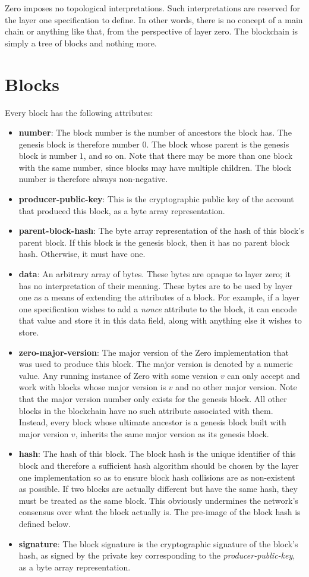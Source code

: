 \documentclass[12pt]{article}
\begin{document}
Zero imposes no topological interpretations. Such interpretations are reserved for the layer one specification to define. In other words, there is no concept of a main chain or anything like that, from the perspective of layer zero. The blockchain is simply a tree of blocks and nothing more.

\section{Blocks}
Every block has the following attributes:
\begin{itemize}
\item \textbf{number}: The block number is the number of ancestors the block has. The genesis block is therefore number $0$. The block whose parent is the genesis block is number $1$, and so on. Note that there may be more than one block with the same number, since blocks may have multiple children. The block number is therefore always non-negative.
\item \textbf{producer-public-key}: This is the cryptographic public key of the account that produced this block, as a byte array representation.
\item \textbf{parent-block-hash}: The byte array representation of the hash of this block's parent block. If this block is the genesis block, then it has no parent block hash. Otherwise, it must have one.
\item \textbf{data}: An arbitrary array of bytes. These bytes are opaque to layer zero; it has no interpretation of their meaning. These bytes are to be used by layer one as a means of extending the attributes of a block. For example, if a layer one specification wishes to add a \textit{nonce} attribute to the block, it can encode that value and store it in this data field, along with anything else it wishes to store.
\item \textbf{zero-major-version}: The major version of the Zero implementation that was used to produce this block. The major version is denoted by a numeric value. Any running instance of Zero with some version $v$ can only accept and work with blocks whose major version is $v$ and no other major version. Note that the major version number only exists for the genesis block. All other blocks in the blockchain have no such attribute associated with them. Instead, every block whose ultimate ancestor is a genesis block built with major version $v$, inherits the same major version as its genesis block.
\item \textbf{hash}: The hash of this block. The block hash is the unique identifier of this block and therefore a sufficient hash algorithm should be chosen by the layer one implementation so as to ensure block hash collisions are as non-existent as possible. If two blocks are actually different but have the same hash, they must be treated as the same block. This obviously undermines the network's consensus over what the block actually is. The pre-image of the block hash is defined below.
\item \textbf{signature}: The block signature is the cryptographic signature of the block's hash, as signed by the private key corresponding to the \textit{producer-public-key}, as a byte array representation.
\end{itemize}
\end{document}

